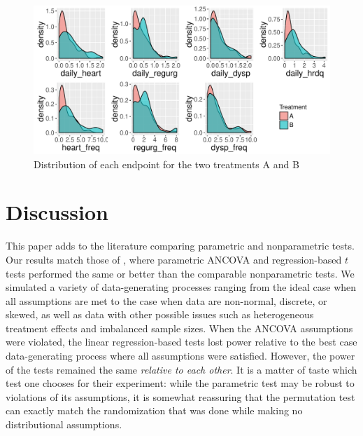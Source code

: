 \documentclass[11pt]{article}
\begin{document}
\begin{figure}
\centering
\includegraphics[width = \textwidth]{fig/clinical_distr}
\caption{Distribution of each endpoint for the two treatments A and B}
\label{fig:clinical_distr}
\end{figure}


\begin{center}

\end{center}

\section*{Discussion}

This paper adds to the literature comparing parametric and nonparametric tests.
Our results match those of \cite{vickers_parametric_2005, anderson_empirical_1999}, where parametric ANCOVA and regression-based $t$ tests performed the same or better than the comparable nonparametric tests.
We simulated a variety of data-generating processes ranging from the ideal case when all assumptions are met 
to the case when data are non-normal, discrete, or skewed,
as well as data with other possible issues such as heterogeneous treatment effects and imbalanced sample sizes.
When the ANCOVA assumptions were violated, the linear regression-based tests lost power relative to the best case data-generating process where all assumptions were satisfied.
However, the power of the tests remained the same \textit{relative to each other}.
It is a matter of taste which test one chooses for their experiment: while the parametric test may be robust to violations of its assumptions, it is somewhat reassuring that the permutation test can exactly match the randomization that was done while making no distributional assumptions.
\end{document}
